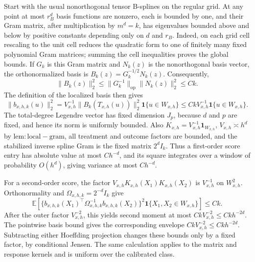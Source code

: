 Start with the usual nonorthogonal tensor B-splines on the regular grid. At any point at most \(r_B^d\) basis functions are nonzero, each is bounded by one, and their Gram matrix, after multiplication by \(m^d=k\), has eigenvalues bounded above and below by positive constants depending only on \(d\) and \(r_B\). Indeed, on each grid cell rescaling to the unit cell reduces the quadratic form to one of finitely many fixed polynomial Gram matrices; summing the cell inequalities proves the global bounds. If \(G_k\) is this Gram matrix and \(N_k(z)\) is the nonorthogonal basis vector, the orthonormalized basis is \(B_k(z)=G_k^{-1/2}N_k(z)\). Consequently,
\[
\|B_k(z)\|_2^2
 \le \|G_k^{-1}\|_{\mathrm{op}}\|N_k(z)\|_2^2
 \le Ck.
\]
The definition of the localized basis then gives
\[
\|b_{x,h,k}(u)\|_2^2
 =V_{x,h}^{-1}\|B_k(T_{x,h}(u))\|_2^2
 \mathbf 1\{u\in W_{x,h}\}
 \le CkV_{x,h}^{-1}\mathbf 1\{u\in W_{x,h}\}.
\]
The total-degree Legendre vector has fixed dimension \(J_p\), because \(d\) and \(p\) are fixed, and hence its norm is uniformly bounded. Also \(K_{x,h}=V_{x,h}^{-1}\mathbf 1_{W_{x,h}}\), \(V_{x,h}\asymp h^d\) by \(\mathrm{lem:local-gram}\), all treatment and outcome factors are bounded, and the stabilized inverse spline Gram is the fixed matrix \(2^dI_k\). Thus a first-order score entry has absolute value at most \(Ch^{-d}\), and its square integrates over a window of probability \(O(h^d)\), giving variance at most \(Ch^{-d}\).

For a second-order score, the factor \(V_{x,h}K_{x,h}(X_1)K_{x,h}(X_2)\) is \(V_{x,h}^{-1}\) on \(W_{x,h}^2\). Orthonormality and \(\Omega_{x,h,k}=2^{-d}I_k\) give
\[
\mathbb E\!\left[\{b_{x,h,k}(X_1)^\top\Omega_{x,h,k}^{-1}b_{x,h,k}(X_2)\}^2
 \mathbf 1\{X_1,X_2\in W_{x,h}\}\right]\le Ck.
\]
After the outer factor \(V_{x,h}^{-2}\), this yields second moment at most \(CkV_{x,h}^{-2}\le Ckh^{-2d}\). The pointwise basis bound gives the corresponding envelope \(CkV_{x,h}^{-2}\le Ckh^{-2d}\). Subtracting either Hoeffding projection changes these bounds only by a fixed factor, by conditional Jensen. The same calculation applies to the matrix and response kernels and is uniform over the calibrated class.